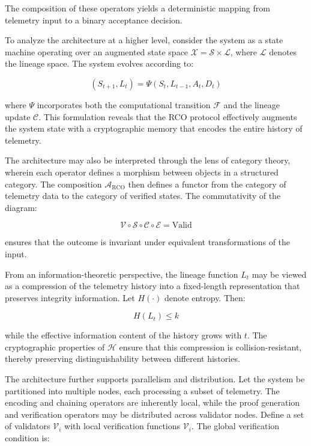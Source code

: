 The composition of these operators yields a deterministic mapping from telemetry input to a binary acceptance decision.

To analyze the architecture at a higher level, consider the system as a state machine operating over an augmented state space $\mathcal{X} = \mathcal{S} \times \mathcal{L}$, where $\mathcal{L}$ denotes the lineage space. The system evolves according to:

\begin{equation}
(S_{t+1}, L_t) = \Psi(S_t, L_{t-1}, A_t, D_t)
\end{equation}

where $\Psi$ incorporates both the computational transition $\mathcal{F}$ and the lineage update $\mathcal{C}$. This formulation reveals that the RCO protocol effectively augments the system state with a cryptographic memory that encodes the entire history of telemetry.

The architecture may also be interpreted through the lens of category theory, wherein each operator defines a morphism between objects in a structured category. The composition $\mathcal{A}_{\text{RCO}}$ then defines a functor from the category of telemetry data to the category of verified states. The commutativity of the diagram:

\begin{equation}
\mathcal{V} \circ \mathcal{S} \circ \mathcal{C} \circ \mathcal{E} = \text{Valid}
\end{equation}

ensures that the outcome is invariant under equivalent transformations of the input.

From an information-theoretic perspective, the lineage function $L_t$ may be viewed as a compression of the telemetry history into a fixed-length representation that preserves integrity information. Let $H(\cdot)$ denote entropy. Then:

\begin{equation}
H(L_t) \leq k
\end{equation}

while the effective information content of the history grows with $t$. The cryptographic properties of $\mathcal{H}$ ensure that this compression is collision-resistant, thereby preserving distinguishability between different histories.

The architecture further supports parallelism and distribution. Let the system be partitioned into multiple nodes, each processing a subset of telemetry. The encoding and chaining operators are inherently local, while the proof generation and verification operators may be distributed across validator nodes. Define a set of validators $\mathcal{V}_i$ with local verification functions $\mathcal{V}_i$. The global verification condition is:

